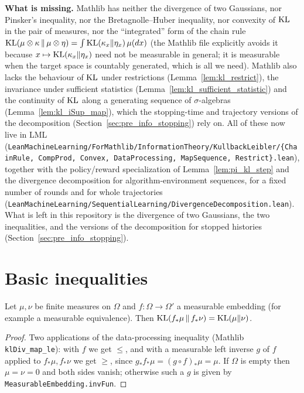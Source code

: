 \textbf{What is missing.} Mathlib has neither the divergence of two Gaussians, nor Pinsker's
inequality, nor the Bretagnolle--Huber inequality, nor convexity of $\mathrm{KL}$ in the pair of
measures, nor the ``integrated'' form of the chain rule
$\mathrm{KL}(\mu\otimes\kappa\,\|\,\mu\otimes\eta) = \int \mathrm{KL}(\kappa_x\|\eta_x)\,\mu(dx)$ (the Mathlib file
explicitly avoids it because $x \mapsto \mathrm{KL}(\kappa_x\|\eta_x)$ need not be measurable in
general; it is measurable when the target space is countably generated, which is all we need).
Mathlib also lacks the behaviour of $\mathrm{KL}$ under restrictions (Lemma~\ref{lem:kl_restrict}), the
invariance under sufficient statistics (Lemma~\ref{lem:kl_sufficient_statistic}) and the
continuity of $\mathrm{KL}$ along a generating sequence of $\sigma$-algebras
(Lemma~\ref{lem:kl_iSup_map}), which the stopping-time and trajectory versions of the
decomposition (Section~\ref{sec:pre_info_stopping}) rely on. All of these now live in LML
(\texttt{LeanMachineLearning/ForMathlib/InformationTheory/KullbackLeibler/\{ChainRule, CompProd,
Convex, DataProcessing, MapSequence, Restrict\}.lean}), together with the policy/reward
specialization of Lemma~\ref{lem:pi_kl_step} and the divergence decomposition for
algorithm-environment sequences, for a fixed number of rounds and for whole trajectories
(\texttt{LeanMachineLearning/SequentialLearning/DivergenceDecomposition.lean}). What is left in
this repository is the divergence of two Gaussians, the two inequalities, and the versions of
the decomposition for stopped histories (Section~\ref{sec:pre_info_stopping}).

\section{Basic inequalities}
\label{sec:pre_info_basic}

\begin{lemma}\label{lem:pi_kl_measurable_equiv}
\leanok
Let $\mu,\nu$ be finite measures on $\Omega$ and $f : \Omega \to \Omega'$ a measurable embedding
(for example a measurable equivalence). Then $\mathrm{KL}(f_*\mu \,\|\, f_*\nu) = \mathrm{KL}(\mu\|\nu)$.
\end{lemma}

\begin{proof}
\leanok
Two applications of the data-processing inequality (Mathlib \texttt{klDiv\_map\_le}): with
$f$ we get $\le$, and with a measurable left inverse $g$ of $f$ applied to $f_*\mu, f_*\nu$ we get
$\ge$, since $g_*f_*\mu = (g \circ f)_*\mu = \mu$. If $\Omega$ is empty then $\mu = \nu = 0$ and
both sides vanish; otherwise such a $g$ is given by \texttt{MeasurableEmbedding.invFun}.
\end{proof}


